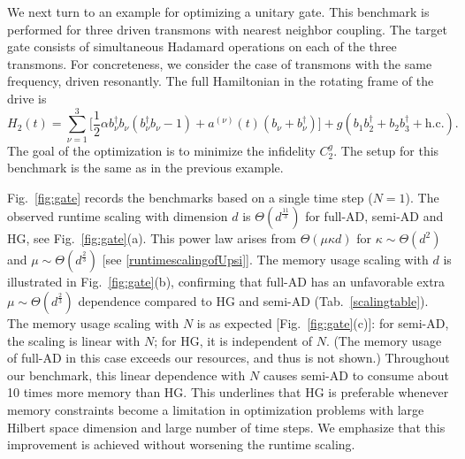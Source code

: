 We next turn to an example for optimizing a unitary gate. This benchmark is performed for three driven transmons with nearest neighbor coupling. The target gate consists of simultaneous Hadamard operations on each of the three transmons. For concreteness, we consider the case of transmons with the same frequency, driven resonantly. The full Hamiltonian in the rotating frame of the drive is
\begin{equation}
\label{gateH}
    H_2(t)=\sum_{\nu=1}^{3}\bigg[\frac{1}{2}\alpha b_\nu^\dagger b_\nu (b_\nu^\dagger b_\nu-1)+a^{(\nu)}(t)(b_\nu+b_\nu^\dagger)\bigg]+g(b_1b_{2}^\dagger+b_2b_{3}^\dagger+\text{h.c.}).
\end{equation}
The goal of the optimization is to minimize the infidelity $C_2^{ g}$. The setup for this benchmark is the same as in the previous example.



Fig.\ \ref{fig:gate} records the  benchmarks based on a single time step ($N=1$). The observed runtime scaling with dimension $d$ is $\Theta(d^{\frac{11}{3}})$ for full-AD, semi-AD and HG, see Fig.\ \ref{fig:gate}(a). This power law arises from $\Theta(\mu\kappa d)$ for $\kappa\sim \Theta(d^2)$ and $\mu\sim \Theta(d^{\frac{2}{3}})$ [see   \ref{runtimescalingofUpsi}]. The memory usage scaling with $d$ is illustrated in Fig.\ \ref{fig:gate}(b), confirming that full-AD has an unfavorable extra $\mu \sim \Theta(d^{\frac{2}{3}})$ dependence compared to HG and semi-AD (Tab.\  \ref{scalingtable}). The memory usage scaling with $N$ is as expected [Fig.\ \ref{fig:gate}(c)]: for semi-AD, the scaling is linear with $N$; for HG, it is independent of $N$. (The memory usage of full-AD in this case exceeds our resources, and thus is not shown.) Throughout our benchmark, this linear dependence with $N$ causes semi-AD to consume about 10 times more memory than HG. This underlines that HG is preferable whenever memory constraints become a limitation in optimization problems with large Hilbert space dimension and large number of time steps. We emphasize that this improvement is achieved without worsening the runtime scaling. 


